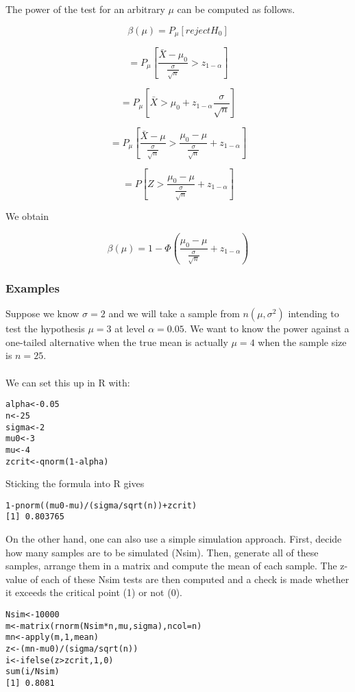 \documentclass[12pt,a4paper]{article}
\theoremstyle{regla}
\theoremstyle{remark}
\theoremstyle{definition}
\theoremstyle{nonumberbreak}
\begin{document}
The power of the test for an arbitrary $\mu $ can be computed as follows.
 
 $$\beta(\mu) = P_{\mu} [reject H_0]$$

 $$= P_{\mu}[\frac{\bar {X} - \mu_0}{\frac{\sigma} {\sqrt{n}}} > z_{1- \alpha}]$$

 $$= P_{\mu} [\bar {X}> \mu_0 + z_{1- \alpha}{\frac{\sigma} {\sqrt{n}}}]$$

$$= P_{\mu} [\frac{\bar {X} - \mu}{\frac{\sigma} {\sqrt{n}}}> \frac{\mu_0 - \mu }{\frac{\sigma} {\sqrt{n}}}+ z_{1- \alpha}]$$

$$ = P[Z > \frac{\mu_0 - \mu}{\frac{\sigma} {\sqrt{n}}} + z_{1- \alpha}]$$

We obtain

$$
\beta(\mu) = 1 - \Phi \left ( \frac{\mu_0 - \mu }{\frac{\sigma} {\sqrt{n}}} + z_{1- \alpha} \right )
$$


\subsubsection{Examples}
\begin{xmpl}
Suppose we know $\sigma=2$ and we will take a sample 
from $n\left ( \mu, \sigma^2\right)$
intending to test the hypothesis $\mu=3$ at level $\alpha=0.05$. We want to know the power
against a one-tailed alternative when the true mean is actually $\mu=4$ when the sample size is $n=25$. \\\\

We can set this up in R with:
\begin{lstlisting}
alpha<-0.05
n<-25
sigma<-2
mu0<-3
mu<-4
zcrit<-qnorm(1-alpha)
\end{lstlisting}


Sticking the formula into R gives
\begin{lstlisting}
1-pnorm((mu0-mu)/(sigma/sqrt(n))+zcrit)
[1] 0.803765
\end{lstlisting}

On the other hand, one can also use a simple simulation approach. First, decide how many samples are to be simulated (Nsim). Then, generate all of these samples, arrange them in a matrix and compute the mean of each sample.  The z-value of each of these Nsim tests are then computed and a check is made whether it exceeds the critical point (1) or not (0).
\begin{lstlisting}
Nsim<-10000
m<-matrix(rnorm(Nsim*n,mu,sigma),ncol=n)
mn<-apply(m,1,mean)
z<-(mn-mu0)/(sigma/sqrt(n))
i<-ifelse(z>zcrit,1,0)
sum(i/Nsim)
[1] 0.8081
\end{lstlisting}
\end {xmpl}
\end{document}
